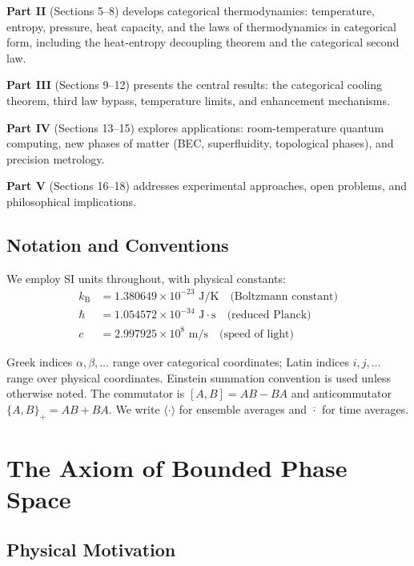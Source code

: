 \documentclass[twocolumn,10pt,twoside]{article}
\newcommand{\kb}{k_{\mathrm{B}}}
\begin{document}
\textbf{Part II} (Sections 5--8) develops categorical thermodynamics: temperature, entropy, pressure, heat capacity, and the laws of thermodynamics in categorical form, including the heat-entropy decoupling theorem and the categorical second law.

\textbf{Part III} (Sections 9--12) presents the central results: the categorical cooling theorem, third law bypass, temperature limits, and enhancement mechanisms.

\textbf{Part IV} (Sections 13--15) explores applications: room-temperature quantum computing, new phases of matter (BEC, superfluidity, topological phases), and precision metrology.

\textbf{Part V} (Sections 16--18) addresses experimental approaches, open problems, and philosophical implications.

\subsection{Notation and Conventions}

We employ SI units throughout, with physical constants:
\begin{align}
\kb &= 1.380649 \times 10^{-23} \text{ J/K} \quad \text{(Boltzmann constant)} \nonumber \\
\hbar &= 1.054572 \times 10^{-34} \text{ J}\cdot\text{s} \quad \text{(reduced Planck)} \nonumber \\
c &= 2.997925 \times 10^{8} \text{ m/s} \quad \text{(speed of light)} \nonumber
\end{align}

Greek indices $\alpha, \beta, \ldots$ range over categorical coordinates; Latin indices $i, j, \ldots$ range over physical coordinates. Einstein summation convention is used unless otherwise noted. The commutator is $[A, B] = AB - BA$ and anticommutator $\{A, B\}_+ = AB + BA$. We write $\langle \cdot \rangle$ for ensemble averages and $\overline{\cdot}$ for time averages.

\section{The Axiom of Bounded Phase Space}

\subsection{Physical Motivation}
\end{document}
